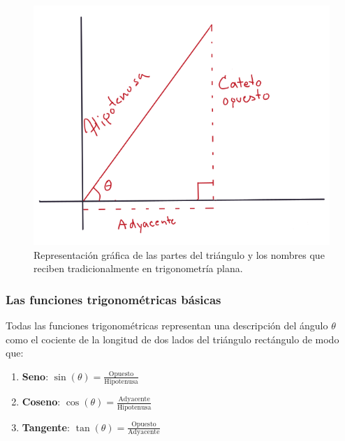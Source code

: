 \documentclass[
]{book}
\providecommand{\tightlist}{%
  \setlength{\itemsep}{0pt}\setlength{\parskip}{0pt}}
\begin{document}
\begin{figure}

{\centering \includegraphics[width=7.86in]{Unidad-II/nomenclatura} 

}

\caption{Representación gráfica de las partes del triángulo y los nombres que reciben tradicionalmente en trigonometría plana.}\label{fig:nomen-trig}
\end{figure}

\hypertarget{las-funciones-trigonomuxe9tricas-buxe1sicas}{%
\subsubsection{Las funciones trigonométricas básicas}\label{las-funciones-trigonomuxe9tricas-buxe1sicas}}

Todas las funciones trigonométricas representan una descripción del ángulo \(\theta\) como el cociente de la longitud de dos lados del triángulo rectángulo de modo que:

\begin{enumerate}
\def\labelenumi{\arabic{enumi}.}
\tightlist
\item
  \textbf{Seno}: \(\sin(\theta) = \frac{\mathrm{Opuesto}}{\mathrm{Hipotenusa}}\)
\item
  \textbf{Coseno}: \(\cos(\theta) = \frac{\mathrm{Adyacente}}{\mathrm{Hipotenusa}}\)
\item
  \textbf{Tangente}: \(\tan(\theta) = \frac{\mathrm{Opuesto}}{\mathrm{Adyacente}}\)
\end{enumerate}
\end{document}
